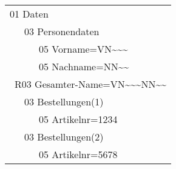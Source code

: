 \begin{tabularx}{0px}{l}
01 Daten\\
\ \ \ 03 Personendaten\\
\ \ \ \ \ \ 05 Vorname=VN\textasciitilde \textasciitilde \textasciitilde\\
\ \ \ \ \ \ 05 Nachname=NN\textasciitilde \textasciitilde\\
\ R03 Gesamter-Name=VN\textasciitilde \textasciitilde \textasciitilde NN\textasciitilde \textasciitilde\\
\ \ \ 03 Bestellungen(1)\\
\ \ \ \ \ \ 05 Artikelnr=1234\\
\ \ \ 03 Bestellungen(2)\\
\ \ \ \ \ \ 05 Artikelnr=5678\\
\end{tabularx}